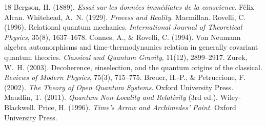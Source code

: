 \documentclass[11pt,a4paper]{article}
\begin{document}
\begin{thebibliography}{18}
 Bergson, H. (1889). \emph{Essai sur les donn\'ees imm\'ediates de la conscience}. F\'elix Alcan.
 Whitehead, A.~N. (1929). \emph{Process and Reality}. Macmillan.
 Rovelli, C. (1996). Relational quantum mechanics. \emph{International Journal of Theoretical Physics}, 35(8), 1637--1678.
 Connes, A., \& Rovelli, C. (1994). Von Neumann algebra automorphisms and time-thermodynamics relation in generally covariant quantum theories. \emph{Classical and Quantum Gravity}, 11(12), 2899--2917.
 Zurek, W.~H. (2003). Decoherence, einselection, and the quantum origins of the classical. \emph{Reviews of Modern Physics}, 75(3), 715--775.
 Breuer, H.-P., \& Petruccione, F. (2002). \emph{The Theory of Open Quantum Systems}. Oxford University Press.
 Maudlin, T. (2011). \emph{Quantum Non-Locality and Relativity} (3rd ed.). Wiley-Blackwell.
 Price, H. (1996). \emph{Time's Arrow and Archimedes' Point}. Oxford University Press.
\end{thebibliography}
\end{document}
